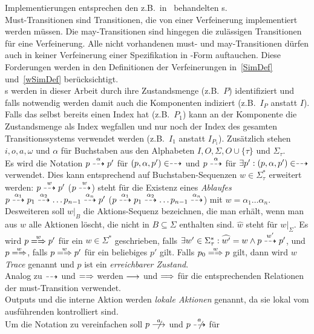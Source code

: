 Implementierungen entsprechen den z.B.\ in~\cite{Schinko2016BA} behandelten
\EIO{}s.\\
Must-Transitionen sind Transitionen, die von einer Verfeinerung implementiert
werden müssen. Die may-Transitionen sind hingegen die zulässigen Transitionen
für eine Verfeinerung. Alle nicht vorhandenen must- und may-Transitionen dürfen
auch in keiner Verfeinerung einer Spezifikation in \MEIO{}-Form auftauchen.
Diese Forderungen werden in den Definitionen der Verfeinerungen in~\ref{SimDef}
und~\ref{wSimDef} berücksichtigt.\\
\MEIO{}s  werden in dieser Arbeit durch ihre Zustandsmenge (z.B.\ $P$)
identifiziert und falls notwendig werden damit auch die Komponenten indiziert
(z.B.\ $I_P$ anstatt $I$). Falls das \MEIO{} selbst bereits einen Index hat
(z.B.\ $P_1$) kann an der Komponente die Zustandsmenge als Index wegfallen und
nur noch der Index des gesamten Transitionssystems verwendet werden (z.B.\
$I_1$ anstatt $I_{P_1}$). Zusätzlich stehen $i,o,a,\omega$ und $\alpha$ für
Buchstaben aus den Alphabeten $I,O,\Sigma ,O\cup\{\tau\}$ und $\Sigma_\tau$.\\
Es wird die Notation $p\may[\alpha] p'$ für $(p,\alpha,p')\in\may$ und
$p\may[\alpha]$ für $\exists p':(p,\alpha,p')\in\may$ verwendet. Dies kann
entsprechend auf Buchstaben-Sequenzen $w\in\Sigma_{\tau}^*$ erweitert werden:
$p\may[w]p'$ ($p\may[w]$) steht für die Existenz eines \emph{Ablaufes}
$p\may[\alpha _1]p_1\may[\alpha _2]\dots p_{n-1}\may[\alpha _n] p'$
($p\may[\alpha _1] p_1 \may[\alpha _2]\dots p_{n-1}\may[\alpha _n]$) mit
$w=\alpha _1\dots \alpha _n$.\\
Desweiteren soll $w|_B$ die Aktions-Sequenz bezeichnen, die man erhält, wenn
man aus $w$ alle Aktionen löscht, die nicht in $B\subseteq\Sigma$ enthalten
sind. $\widehat{w}$ steht für $w|_{\Sigma}$. Es wird $p\weakmay[w] p'$
für ein $w\in\Sigma ^*$ geschrieben, falls $\exists
w'\in\Sigma_{\tau}^*:\widehat{w'}=w\land p\may[w']p'$, und $p\weakmay[w]$,
falls $p\weakmay[w] p'$ für ein beliebiges $p'$ gilt. Falls $p_0\weakmay[w] p$
gilt, dann wird $w$ \emph{Trace} genannt und $p$ ist ein \emph{erreichbarer
Zustand}.\\
Analog zu $\may$ und $\weakmay$ werden $\must$ und $\weakmust$ für die
entsprechenden Relationen der must-Transition verwendet.\\
Outputs und die interne Aktion werden \emph{lokale Aktionen} genannt, da sie
lokal vom ausführenden \MEIO{} kontrolliert sind.\\
Um die Notation zu vereinfachen soll $p\nmust[a]$ und $p\nmay[a]$ für
